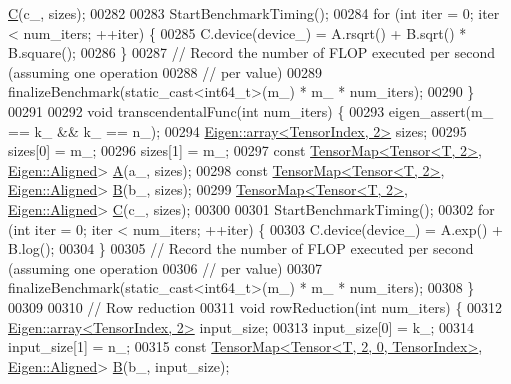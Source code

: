 \begin{DoxyCode}
      \hyperlink{group___core___module}{C}(c\_, sizes);
00282 
00283     StartBenchmarkTiming();
00284     \textcolor{keywordflow}{for} (\textcolor{keywordtype}{int} iter = 0; iter < num\_iters; ++iter) \{
00285       C.device(device\_) = A.rsqrt() + B.sqrt() * B.square();
00286     \}
00287     \textcolor{comment}{// Record the number of FLOP executed per second (assuming one operation}
00288     \textcolor{comment}{// per value)}
00289     finalizeBenchmark(static\_cast<int64\_t>(m\_) * m\_ * num\_iters);
00290   \}
00291 
00292   \textcolor{keywordtype}{void} transcendentalFunc(\textcolor{keywordtype}{int} num\_iters) \{
00293     eigen\_assert(m\_ == k\_ && k\_ == n\_);
00294     \hyperlink{class_eigen_1_1array}{Eigen::array<TensorIndex, 2>} sizes;
00295     sizes[0] = m\_;
00296     sizes[1] = m\_;
00297     \textcolor{keyword}{const} \hyperlink{class_eigen_1_1_tensor_map}{TensorMap<Tensor<T, 2>}, \hyperlink{group__enums_gga45fe06e29902b7a2773de05ba27b47a1ad37d4c71425bb286e9b4103830538fbf}{Eigen::Aligned}> 
      \hyperlink{group___core___module_class_eigen_1_1_matrix}{A}(a\_, sizes);
00298     \textcolor{keyword}{const} \hyperlink{class_eigen_1_1_tensor_map}{TensorMap<Tensor<T, 2>}, \hyperlink{group__enums_gga45fe06e29902b7a2773de05ba27b47a1ad37d4c71425bb286e9b4103830538fbf}{Eigen::Aligned}> 
      \hyperlink{group___core___module_class_eigen_1_1_matrix}{B}(b\_, sizes);
00299     \hyperlink{class_eigen_1_1_tensor_map}{TensorMap<Tensor<T, 2>}, \hyperlink{group__enums_gga45fe06e29902b7a2773de05ba27b47a1ad37d4c71425bb286e9b4103830538fbf}{Eigen::Aligned}> 
      \hyperlink{group___core___module}{C}(c\_, sizes);
00300 
00301     StartBenchmarkTiming();
00302     \textcolor{keywordflow}{for} (\textcolor{keywordtype}{int} iter = 0; iter < num\_iters; ++iter) \{
00303       C.device(device\_) = A.exp() + B.log();
00304     \}
00305     \textcolor{comment}{// Record the number of FLOP executed per second (assuming one operation}
00306     \textcolor{comment}{// per value)}
00307     finalizeBenchmark(static\_cast<int64\_t>(m\_) * m\_ * num\_iters);
00308   \}
00309 
00310  \textcolor{comment}{// Row reduction}
00311   \textcolor{keywordtype}{void} rowReduction(\textcolor{keywordtype}{int} num\_iters) \{
00312     \hyperlink{class_eigen_1_1array}{Eigen::array<TensorIndex, 2>} input\_size;
00313     input\_size[0] = k\_;
00314     input\_size[1] = n\_;
00315     \textcolor{keyword}{const} \hyperlink{class_eigen_1_1_tensor_map}{TensorMap<Tensor<T, 2, 0, TensorIndex>}, 
      \hyperlink{group__enums_gga45fe06e29902b7a2773de05ba27b47a1ad37d4c71425bb286e9b4103830538fbf}{Eigen::Aligned}> \hyperlink{group___core___module_class_eigen_1_1_matrix}{B}(b\_, input\_size);

\end{DoxyCode}
